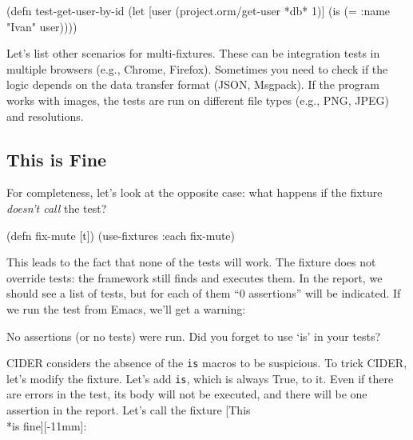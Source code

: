 \begin{english}
  \begin{clojure}
(defn test-get-user-by-id
  (let [user (project.orm/get-user *db* 1)]
    (is (= {:name "Ivan"} user))))
  \end{clojure}
\end{english}

\fi

Let's list other scenarios for multi-fixtures. These can be integration tests in multiple browsers (e.g., Chrome, Firefox). Sometimes you need to check if the logic depends on the data transfer format (JSON, Msgpack). If the program works with images, the tests are run on different file types (e.g., PNG, JPEG) and resolutions.

\subsection{This is Fine}

For completeness, let's look at the opposite case: what happens if the fixture\emph{ doesn't call} the test?


\begin{english}
  \begin{clojure}
(defn fix-mute [t])
(use-fixtures :each fix-mute)
  \end{clojure}
\end{english}

This leads to the fact that none of the tests will work. The fixture does not override tests: the framework still finds and executes them. In the report, we should see a list of tests, but for each of them “0 assertions” will be indicated. If we run the test from Emacs, we'll get a warning:

\begin{english}
  \begin{clojure}
No assertions (or no tests) were run.
Did you forget to use ‘is’ in your tests?
  \end{clojure}
\end{english}


CIDER considers the absence of the \verb|is| macros to be suspicious. To trick CIDER, let's modify the fixture. Let's add \verb|is|, which is always True, to it. Even if there are errors in the test, its body will not be executed, and there will be one assertion in the report. Let's call the fixture [This\\*is fine][-11mm]:

